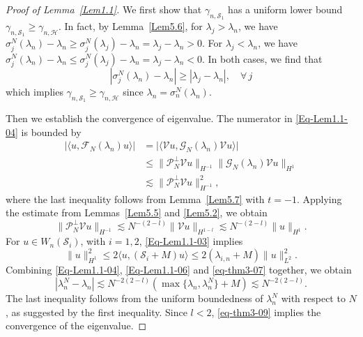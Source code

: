 \documentclass{sn-jnl}%
\numberwithin{equation}{section}
\theoremstyle{thmstyleone}%
\theoremstyle{thmstyletwo}%
\theoremstyle{thmstylethree}%
\begin{document}
\begin{proof}[Proof of Lemma~\ref{Lem1.1}]
We first show that $\gamma_{n, \mathcal{S}_1}$ has a uniform lower bound $\gamma_{n, \mathcal{S}_1} \geq \gamma_{n, \mathcal{H}}$. In fact, by Lemma~\ref{Lem5.6},
for $\lambda_j > \lambda_n$, we have
$
\sigma_j^N(\lambda_n) - \lambda_n \geq \sigma_j^N(\lambda_j) - \lambda_n = \lambda_j - \lambda_n > 0.
$
For $\lambda_j < \lambda_n$, we have
$
\sigma_j^N(\lambda_n) - \lambda_n \leq \sigma_j^N(\lambda_j) - \lambda_n = \lambda_j - \lambda_n < 0.
$
In both cases, we find that
\[
|\sigma_j^N(\lambda_n) - \lambda_n| \geq |\lambda_j - \lambda_n|, \quad \forall\, j
\]
which implies $\gamma_{n, \mathcal{S}_1}\geq \gamma_{n,\mathcal{H}}$ since $\lambda_n=\sigma^N_n(\lambda_n)$. 

Then we establish the convergence of eigenvalue. The numerator in \eqref{Eq-Lem1.1-04} is bounded by
\begin{equation}\label{Eq-Lem1.1-06}
\begin{aligned}    
\bigl|\langle u, \mathcal{F}_N(\lambda_n) u \rangle\bigr|
&= \bigl|\langle \mathcal{V} u, \mathcal{G}_N(\lambda_n) \mathcal{V} u \rangle \bigr| \\
&\leq \|\mathcal{P}_N^\perp \mathcal{V} u\|_{H^{-1}} \|\mathcal{G}_N(\lambda_n) \mathcal{V} u\|_{H^{1}} \\
&\lesssim \|\mathcal{P}_N^\perp \mathcal{V} u\|_{H^{-1}}^2,
\end{aligned}
\end{equation}
where the last inequality follows from Lemma~\ref{Lem5.7} with $t = -1$.
Applying the estimate from Lemmas~\ref{Lem5.5} and \ref{Lem5.2}, we obtain
\begin{equation}\label{eq-thm3-07}
\|\mathcal{P}_N^\perp \mathcal{V} u\|_{H^{-1}} \lesssim N^{-(2-l)} \|\mathcal{V} u\|_{H^{1-l}} \lesssim N^{-(2-l)} \|u\|_{H^1}.
\end{equation}
For $u \in W_n(\mathcal{S}_i)$, with $i = 1,2$, \eqref{Eq-Lem1.1-03} implies
\begin{equation}\label{eq-thm3-08}
\|u\|_{H^1}^2 \leq 2\langle u, (\mathcal{S}_i + M) u \rangle \leq 2 (\lambda_{i,n} + M) \|u\|_{L^2}^2.
\end{equation}
Combining \eqref{Eq-Lem1.1-04}, \eqref{Eq-Lem1.1-06} and \eqref{eq-thm3-07} together, we obtain
\begin{equation}\label{eq-thm3-09}
|\lambda_n^N - \lambda_n| \lesssim N^{-2(2-l)} (\max\{\lambda_n, \lambda_n^N\} + M) \lesssim N^{-2(2-l)}.
\end{equation}
The last inequality follows from the uniform boundedness of $\lambda_n^N$ with respect to $N$, as suggested by the first inequality. Since $l < 2$, \eqref{eq-thm3-09} implies the convergence of the eigenvalue.


\end{proof}
\end{document}
